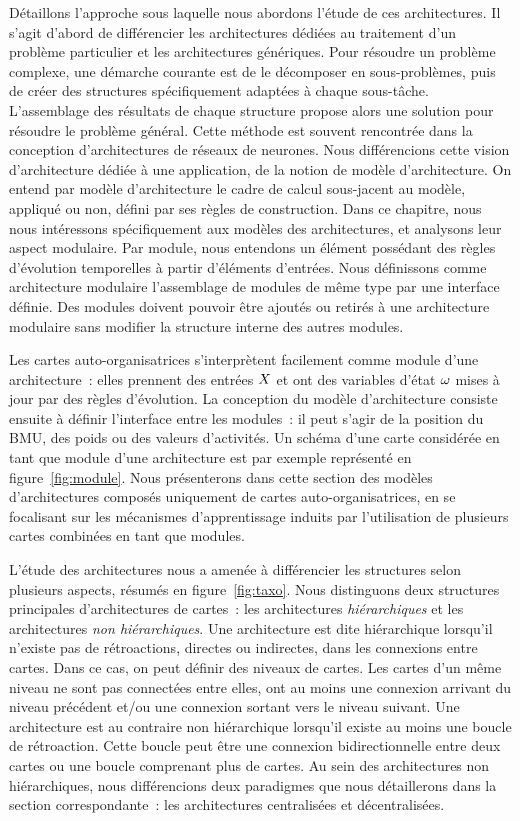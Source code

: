\documentclass[../main]{subfiles}
\begin{document}
Détaillons l'approche sous laquelle nous abordons l'étude de ces architectures.
Il s'agit d'abord de différencier les architectures dédiées au traitement d'un problème particulier et les architectures génériques. 
Pour résoudre un problème complexe, une démarche courante est de le décomposer en sous-problèmes, puis de créer des structures spécifiquement adaptées à chaque sous-tâche. L'assemblage des résultats de chaque structure propose alors une solution pour résoudre le problème général. 
Cette méthode est souvent rencontrée dans la conception d'architectures de réseaux de neurones.
Nous différencions cette vision d'architecture dédiée à une application, de la notion de modèle d'architecture.
On entend par modèle d'architecture le cadre de calcul sous-jacent au modèle, appliqué ou non, défini par ses règles de construction.
Dans ce chapitre, nous nous intéressons spécifiquement aux modèles des architectures, et analysons leur aspect modulaire.
Par module, nous entendons un élément possédant des règles d'évolution temporelles à partir d'éléments d'entrées. Nous définissons comme architecture modulaire l'assemblage de modules de même type par une interface définie. Des modules doivent pouvoir être ajoutés ou retirés à une architecture modulaire sans modifier la structure interne des autres modules.


Les cartes auto-organisatrices s'interprètent facilement comme module d'une architecture~: elles prennent des entrées $X$ et ont des variables d'état $\omega$ mises à jour par des règles d'évolution. La conception du modèle d'architecture consiste ensuite à définir l'interface entre les modules~: il peut s'agir de la position du BMU, des poids ou des valeurs d'activités. 
Un schéma d'une carte considérée en tant que module d'une architecture est par exemple représenté en figure~\ref{fig:module}. 
Nous présenterons dans cette section des modèles d'architectures composés uniquement de cartes auto-organisatrices, en se focalisant sur les mécanismes d'apprentissage induits par l'utilisation de plusieurs cartes combinées en tant que modules.

L'étude des architectures nous a amenée à différencier les structures selon plusieurs aspects, résumés en figure~\ref{fig:taxo}.
Nous distinguons deux structures principales d'architectures de cartes~: les architectures \emph{hiérarchiques} et les architectures \emph{non hiérarchiques}.
Une architecture est dite hiérarchique lorsqu'il n'existe pas de rétroactions, directes ou indirectes, dans les connexions entre cartes. Dans ce cas, on peut définir des niveaux de cartes. Les cartes d'un même niveau ne sont pas connectées entre elles, ont au moins une connexion arrivant du niveau précédent et/ou une connexion sortant vers le niveau suivant.
Une architecture est au contraire non hiérarchique lorsqu'il existe au moins une boucle de rétroaction. Cette boucle peut être une connexion bidirectionnelle entre deux cartes ou une boucle comprenant plus de cartes.
Au sein des architectures non hiérarchiques, nous différencions deux paradigmes que nous détaillerons dans la section correspondante~: les architectures centralisées et décentralisées.
\end{document}
